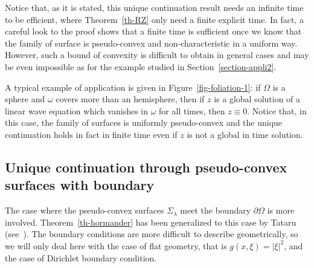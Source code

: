 \documentclass[10pt]{amsart}
\theoremstyle{definition}\newtheorem{defi}[theo]{Definition}\newtheorem{rema}[theo]{Remark}\newtheorem{exam}[theo]{Example}\newtheorem{exem}[theo]{Example}\newtheorem{nota}[theo]{Notation}
\begin{document}
Notice that, as it is stated, this unique continuation result needs an infinite time to be efficient, where Theorem~\ref{th-RZ} only need a finite explicit time. In fact, a careful look to the proof shows that a finite time is sufficient once we know that the family of surface is pseudo-convex and non-characteristic in a uniform way. However, such a bound of convexity is difficult to obtain in general cases and may be even impossible as for the example studied in Section~\ref{section-appli2}.


A typical example of application is given in Figure~\ref{fig-foliation-1}: if $\Omega$ is a sphere and $\omega$ covers more than an hemisphere, then if $z$ is a global solution of a linear wave equation which vanishes in $\omega$ for all times, then $z\equiv 0$. Notice that, in this case, the family of surfaces is uniformly pseudo-convex and the unique continuation holds in fact in finite time even if $z$ is not a global in time solution.



\subsection{Unique continuation through pseudo-convex surfaces with boundary}

The case where the pseudo-convex surfaces $\Sigma_\lambda$ meet the boundary $\partial\Omega$ is more involved. Theorem~\ref{th-hormander} has been generalized to this case by Tataru (see~\cite{Tataru_uniq_analyticCPDE, Tataru, Tataru_uniq_analyticJMPA}). The boundary conditions are more difficult to describe geometrically, so we will only deal here with the case of flat geometry, that is $g(x,\xi)=|\xi|^2$, and the case of Dirichlet boundary condition.
\end{document}
